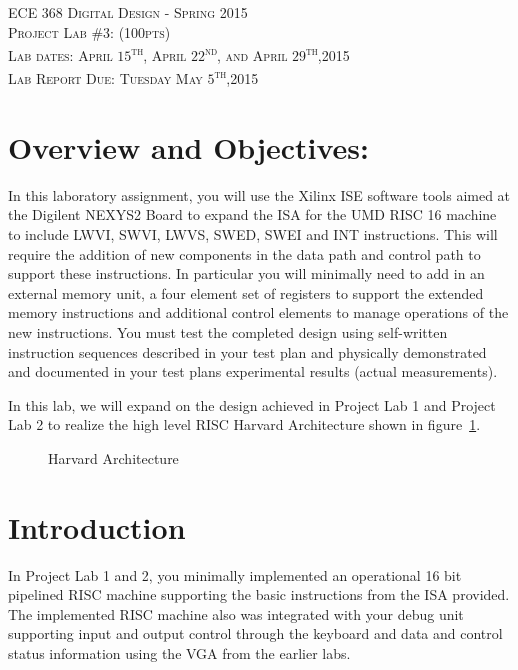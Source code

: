 \documentclass{article}
\begin{document}
\begin{center}
\textsc{\huge ECE 368 Digital Design - Spring 2015}\\[1cm]
\textsc{{\LARGE Project Lab \#3: (100pts)}}\\[0.5cm]
\textsc{\Large Lab dates: April $15$\textsuperscript{th}, April $22$\textsuperscript{nd}, and April $29$\textsuperscript{th},2015}\\[0.5cm]
\textsc{\Large Lab Report Due: Tuesday May $5$\textsuperscript{th},2015}\\[1cm]
\end{center}

\section{Overview and Objectives:}
In this laboratory assignment, you will use the Xilinx ISE software tools aimed at the Digilent NEXYS2 Board to expand the ISA for the UMD RISC 16 machine to include LWVI, SWVI, LWVS, SWED, SWEI and INT instructions. This will require the addition of new components in the data path and control path to support these instructions. In particular you will minimally need to add in an external memory unit, a four element set of registers to support the extended memory instructions and additional control elements to manage operations of the new instructions. You must test the completed design using self-written instruction sequences described in your test plan and physically demonstrated and documented in your test plans experimental results (actual measurements).

In this lab, we will expand on the design achieved in Project Lab 1 and Project Lab 2 to realize the high level RISC Harvard Architecture shown in figure~\ref{fig:harvardarc}.

\begin{figure}[!htbp]
  \centering
  \caption{Harvard Architecture}
  \label{fig:harvardarc}
\end{figure}
\FloatBarrier

\section{Introduction}

In Project Lab 1 and 2, you minimally implemented an operational 16 bit pipelined RISC machine supporting the basic instructions from the ISA provided. The implemented RISC machine also was integrated with your debug unit supporting input and output control through the keyboard and data and control status information using the VGA from the earlier labs. 
\end{document}
